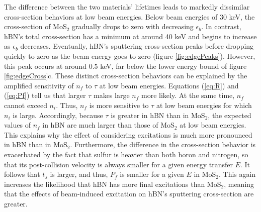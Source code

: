 \documentclass{article}
\begin{document}
The difference between the two materials' lifetimes leads to markedly
dissimilar cross-section behaviors at low beam energies.
Below beam energies of 30 keV, the cross-section of MoS$_2$ gradually drops to
zero with decreasing $\epsilon_b$.
In contrast, hBN's total cross-section has a minimum at around 40 keV and
begins to increase as $\epsilon_b$ decreases.
Eventually, hBN's sputtering cross-section peaks before dropping quickly to
zero as the beam energy goes to zero (figure \ref{fig:edgePeaks}).
However, this peak occurs at around 0.5 keV, far below the lower energy bound
of figure \ref{fig:edgeCross}c.
These distinct cross-section behaviors can be explained by the amplified
sensitivity of $n_f$ to $\tau$ at low beam energies.
Equations (\ref{eq:R}) and (\ref{eq:Pf}) tell us that larger $\tau$
makes large $n_f$ more likely.
At the same time, $n_f$ cannot exceed $n_i$.
Thus, $n_f$ is more sensitive to $\tau$ at low beam energies for which $n_i$ is
large.
Accordingly, because $\tau$ is greater in hBN than in MoS$_2$, the expected
values of $n_f$ in hBN are much larger than those of MoS$_2$ at low beam
energies.
This explains why the effect of considering excitations is much more
pronounced in hBN than in MoS$_2$.
Furthermore, the difference in the cross-section behavior is exacerbated by the
fact that sulfur is heavier than both boron and nitrogen, so that its
post-collision velocity is always smaller for a given energy transfer $E$.
It follows that $t_s$ is larger, and thus, $P_f$ is smaller for a given $E$ in
MoS$_2$.
This again increases the likelihood that hBN has more final excitations than
MoS$_2$, meaning that the effects of beam-induced excitation on hBN's
sputtering cross-section are greater.
\end{document}
